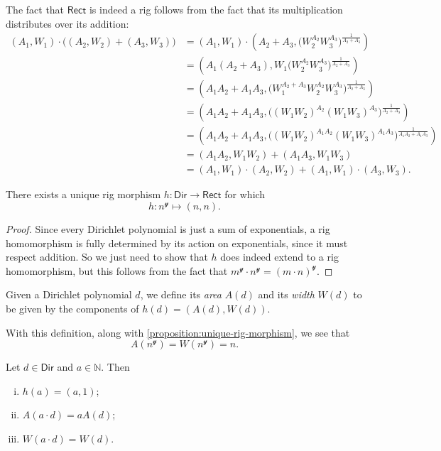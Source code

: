 \documentclass[11pt,fleqn]{article}
\newcommand{\yon}{\mathcal{y}}
\newcommand{\rig}[1]{\mathsf{#1}}
\newcommand{\Dir}{\rig{Dir}}
\newcommand{\Rect}{\rig{Rect}}
\begin{document}
The fact that $\Rect$ is indeed a rig follows from the fact that its multiplication distributes over its addition:
\[
  \begin{aligned}
    (A_1,W_1) \cdot \Big((A_2,W_2)+(A_3,W_3)\Big)
    &= (A_1,W_1) \cdot \left(
        A_2+A_3, \big(W_2^{A_2}W_3^{A_3}\big)^{\frac{1}{A_2+A_3}}
      \right)
  \\&= \left(
        A_1(A_2+A_3), W_1\big(W_2^{A_2}W_3^{A_3}\big)^{\frac{1}{A_2+A_3}}
      \right)
  \\&= \left(
        A_1A_2+A_1A_3, \big(W_1^{A_2+A_3}W_2^{A_2}W_3^{A_3}\big)^{\frac{1}{A_2+A_3}}
      \right)
  \\&= \left(
        A_1A_2+A_1A_3, \big((W_1W_2)^{A_2}(W_1W_3)^{A_3}\big)^{\frac{1}{A_2+A_3}}
      \right)
  \\&= \left(
        A_1A_2+A_1A_3, \big((W_1W_2)^{A_1A_2}(W_1W_3)^{A_1A_3}\big)^{\frac{1}{A_1A_2+A_1A_3}}
      \right)
  \\&= (A_1A_2,W_1W_2) + (A_1A_3,W_1W_3)
  \\&= (A_1,W_1)\cdot(A_2,W_2) + (A_1,W_1)\cdot(A_3,W_3).
  \end{aligned}
\]

\begin{proposition}
\label{proposition:unique-rig-morphism}
  There exists a unique rig morphism $h\colon\Dir\to\Rect$ for which
  \[
    h\colon n^\yon \mapsto (n,n).
  \]
\end{proposition}

\begin{proof}
  Since every Dirichlet polynomial is just a sum of exponentials, a rig homomorphism is fully determined by its action on exponentials, since it must respect addition.
  So we just need to show that $h$ does indeed extend to a rig homomorphism, but this follows from the fact that $m^\yon\cdot n^\yon=(m\cdot n)^\yon$.
\end{proof}

\begin{definition}
  Given a Dirichlet polynomial $d$, we define its \emph{area} $A(d)$ and its \emph{width} $W(d)$ to be given by the components of $h(d)=(A(d),W(d))$.
\end{definition}

With this definition, along with \cref{proposition:unique-rig-morphism}, we see that
\[
  A(n^\yon) = W(n^\yon) = n.
\]

\begin{lemma}
\label{lemma:h-and-scalar-multiples}
  Let $d\in\Dir$ and $a\in\mathbb{N}$.
  Then
  \begin{enumerate}[i.]
    \item $h(a)=(a,1)$;
    \item $A(a\cdot d)=aA(d)$;
    \item $W(a\cdot d)=W(d)$.
  \end{enumerate}
\end{lemma}
\end{document}
